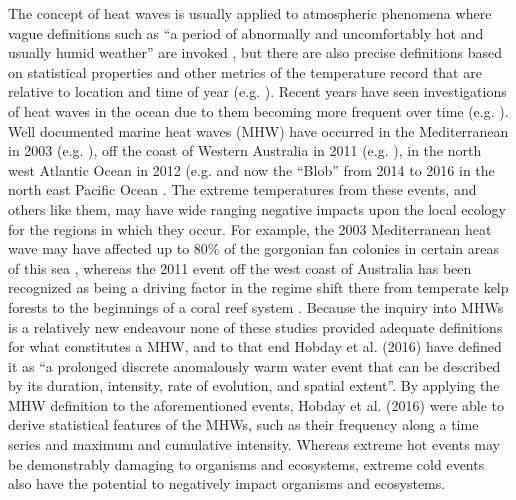 \documentclass[a4paper,10pt,review]{elsarticle}
\begin{document}
The concept of heat waves is usually applied to atmospheric phenomena where vague definitions such as ``a period of abnormally and uncomfortably hot and usually humid weather'' are invoked \cite{Glickman2000}, but there are also precise definitions based on statistical properties and other metrics of the temperature record that are relative to location and time of year (e.g. \cite{Meehl2004, Alexander2006, Fischer2010, Fischer2011}). Recent years have seen investigations of heat waves in the ocean due to them becoming more frequent over time (e.g. \cite{Mackenzie2007, Selig2010, Sura2011, Lima2012, DeCastro2014}). Well documented marine heat waves (MHW) have occurred in the Mediterranean in 2003 (e.g. \cite{Black2004, Olita2007, Garrabou2009}), off the coast of Western Australia in 2011 (e.g. \cite{Feng2013, Pearce2013, Wernberg2013}), in the north west Atlantic Ocean in 2012 (e.g. \cite{Mills2012, Chen2014, Chen2015} and now the ``Blob'' from 2014 to 2016 in the north east Pacific Ocean \cite{Bond2015}. The extreme temperatures from these events, and others like them, may have wide ranging negative impacts upon the local ecology for the regions in which they occur. For example, the 2003 Mediterranean heat wave may have affected up to 80\% of the gorgonian fan colonies in certain areas of this sea \cite{Garrabou2009}, whereas the 2011 event off the west coast of Australia has been recognized as being a driving factor in the regime shift there from temperate kelp forests to the beginnings of a coral reef system \cite{Wernberg2013}. Because the inquiry into MHWs is a relatively new endeavour none of these studies provided adequate definitions for what constitutes a MHW, and to that end Hobday et al. (2016) \cite{Hobday2016} have defined it as ``a prolonged discrete anomalously warm water event that can be described by its duration, intensity, rate of evolution, and spatial extent''. By applying the MHW definition to the aforementioned events, Hobday et al. (2016) \cite{Hobday2016} were able to derive statistical features of the MHWs, such as their frequency along a time series and maximum and cumulative intensity. Whereas extreme hot events may be demonstrably damaging to organisms and ecosystems, extreme cold events also have the potential to negatively impact organisms and ecosystems.
\end{document}
